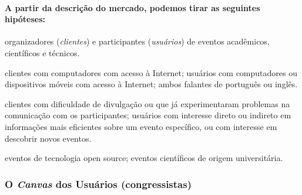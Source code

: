 \documentclass[12pt,a4paper,twoside,hyphens,english,brazil]{abntex2}
\newcommand{\hip}{{\color{BlueViolet}\framebox[1.1\width]{HIP}}}
\begin{document}
\paragraph*{A partir da descrição do mercado, podemos tirar as seguintes hipóteses:}
\begin{description}[itemsep=-1ex]
	\item[Mercado] organizadores (\textit{clientes}) e participantes (\textit{usuários}) de eventos acadêmicos, científicos e técnicos.
	\item[Mercado disponível] clientes com computadores com acesso à Internet; usuários com computadores ou dispositivos móveis com acesso à Internet; ambos falantes de português ou inglês.
	\item[Mercado-alvo] clientes com dificuldade de divulgação ou que já experimentaram problemas na comunicação com os participantes; usuários com interesse direto ou indireto em informações mais eficientes sobre um evento específico, ou com interesse em descobrir novos eventos.
	\item[Mercado-alvo primário] eventos de tecnologia open source; eventos científicos de origem universitária.
\end{description}


\iffalse %
\subsubsection*{O \emph{Canvas} dos Usuários (congressistas)}
\end{document}

